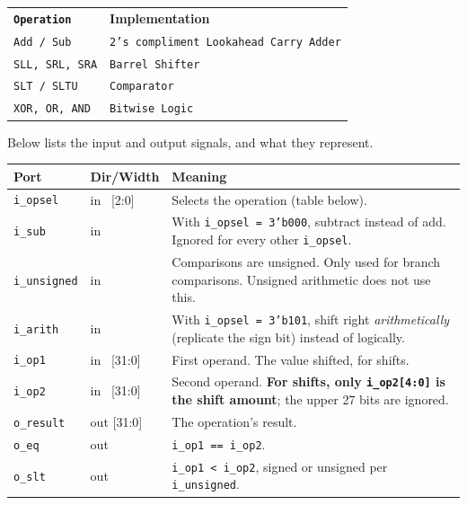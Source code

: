 \documentclass[11pt]{article}
\begin{document}
\begin{center}
  \begin{tabular}{@{}lp{7.8cm}@{}}
    \toprule
    \textbf{\texttt{Operation}} & \textbf{Implementation} \\
    \texttt{Add / Sub} & \texttt{2's compliment Lookahead Carry Adder} \\
    \texttt{SLL, SRL, SRA} & \texttt{Barrel Shifter} \\
    \texttt{SLT / SLTU} & \texttt{Comparator} \\
    \texttt{XOR, OR, AND} & \texttt{Bitwise Logic} \\
    \bottomrule
  \end{tabular}
\end{center}

Below lists the input and output signals, and what they represent.

\begin{center}
\begin{tabular}{@{}llp{8.4cm}@{}}
\toprule
\textbf{Port} & \textbf{Dir/Width} & \textbf{Meaning} \\
\midrule
\texttt{i\_opsel}    & in \ [2:0]  & Selects the operation (table below). \\
\texttt{i\_sub}      & in          & With \texttt{i\_opsel = 3'b000}, subtract instead of add. Ignored for every other \texttt{i\_opsel}. \\
\texttt{i\_unsigned} & in          & Comparisons are unsigned. Only used for branch comparisons. Unsigned arithmetic does not use this.\\
\texttt{i\_arith}    & in          & With \texttt{i\_opsel = 3'b101}, shift right \emph{arithmetically} (replicate the sign bit) instead of logically. \\
\texttt{i\_op1}      & in \ [31:0] & First operand. The value shifted, for shifts. \\
\texttt{i\_op2}      & in \ [31:0] & Second operand. \textbf{For shifts, only \texttt{i\_op2[4:0]} is the shift amount}; the upper 27 bits are ignored. \\
\texttt{o\_result}   & out [31:0]  & The operation's result. \\
\texttt{o\_eq}       & out         & \texttt{i\_op1 == i\_op2}. \\
\texttt{o\_slt}      & out         & \texttt{i\_op1 < i\_op2}, signed or unsigned per \texttt{i\_unsigned}. \\
\bottomrule
\end{tabular}
\end{center}
\end{document}
